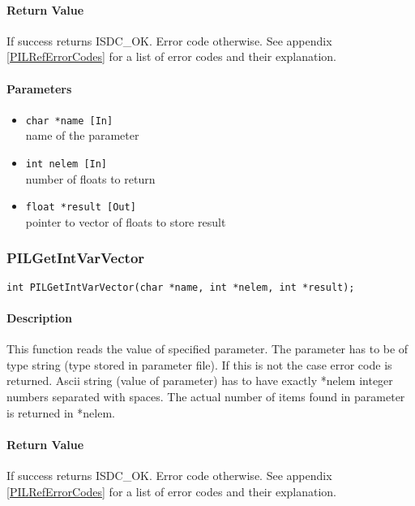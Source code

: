 \paragraph{Return Value\\}
If success returns ISDC\_OK. Error code otherwise. See appendix \ref{PILRefErrorCodes}
for a list of error codes and their explanation.

\paragraph{Parameters}
\begin{itemize}
\item
{\tt char *name [In] } \\
name of the parameter 
\item
{\tt int nelem [In]} \\
number of floats to return
\item
{\tt float *result [Out] } \\
pointer to vector of floats to store result
\end{itemize}



\subsubsection{PILGetIntVarVector}

\begin{verbatim}
int PILGetIntVarVector(char *name, int *nelem, int *result); 
\end{verbatim}

\paragraph{Description\\}
This function reads the value of specified parameter. The parameter has
to be of type string (type stored in parameter file). If this is not the
case error code is returned. Ascii string (value of parameter) has to have
exactly *nelem integer numbers separated with spaces. The actual number
of items found in parameter is returned in *nelem.


\paragraph{Return Value\\}
If success returns ISDC\_OK. Error code otherwise. See appendix \ref{PILRefErrorCodes}
for a list of error codes and their explanation.

